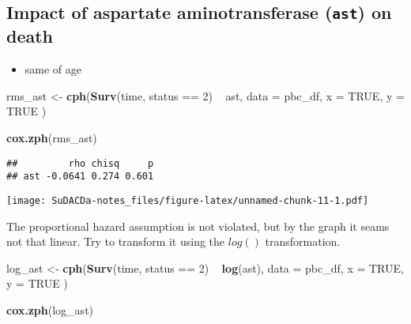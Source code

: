 \documentclass[]{book}
\newenvironment{Shaded}{\begin{snugshade}}{\end{snugshade}}
\newcommand{\KeywordTok}[1]{\textcolor[rgb]{0.13,0.29,0.53}{\textbf{{#1}}}}
\newcommand{\DataTypeTok}[1]{\textcolor[rgb]{0.13,0.29,0.53}{{#1}}}
\newcommand{\DecValTok}[1]{\textcolor[rgb]{0.00,0.00,0.81}{{#1}}}
\newcommand{\StringTok}[1]{\textcolor[rgb]{0.31,0.60,0.02}{{#1}}}
\newcommand{\OtherTok}[1]{\textcolor[rgb]{0.56,0.35,0.01}{{#1}}}
\newcommand{\NormalTok}[1]{{#1}}
\providecommand{\tightlist}{%
  \setlength{\itemsep}{0pt}\setlength{\parskip}{0pt}}
\theoremstyle{definition}
\theoremstyle{definition}
\theoremstyle{definition}
\theoremstyle{remark}
\begin{document}
\subsection{\texorpdfstring{Impact of aspartate aminotransferase
(\texttt{ast}) on
death}{Impact of aspartate aminotransferase (ast) on death}}\label{ast2}

\begin{itemize}
\tightlist
\item
  same of age
\end{itemize}

\begin{Shaded}
\begin{Highlighting}[]
\NormalTok{rms_ast <-}\StringTok{ }\KeywordTok{cph}\NormalTok{(}\KeywordTok{Surv}\NormalTok{(time, status ==}\StringTok{ }\DecValTok{2}\NormalTok{) ~}\StringTok{ }\NormalTok{ast,}
  \DataTypeTok{data =} \NormalTok{pbc_df,}
  \DataTypeTok{x    =} \OtherTok{TRUE}\NormalTok{,}
  \DataTypeTok{y    =} \OtherTok{TRUE}
\NormalTok{)}

\KeywordTok{cox.zph}\NormalTok{(rms_ast)}
\end{Highlighting}
\end{Shaded}

\begin{verbatim}
##         rho chisq     p
## ast -0.0641 0.274 0.601
\end{verbatim}

\begin{Shaded}
\end{Shaded}

\texttt{[image: SuDACDa-notes\_files/figure-latex/unnamed-chunk-11-1.pdf]}

The proportional hazard assumption is not violated, but by the graph it
seams not that linear. Try to transform it using the \(log()\)
transformation.

\begin{Shaded}
\begin{Highlighting}[]
\NormalTok{log_ast <-}\StringTok{ }\KeywordTok{cph}\NormalTok{(}\KeywordTok{Surv}\NormalTok{(time, status ==}\StringTok{ }\DecValTok{2}\NormalTok{) ~}\StringTok{ }\KeywordTok{log}\NormalTok{(ast),}
  \DataTypeTok{data =} \NormalTok{pbc_df,}
  \DataTypeTok{x    =} \OtherTok{TRUE}\NormalTok{,}
  \DataTypeTok{y    =} \OtherTok{TRUE}
\NormalTok{)}

\KeywordTok{cox.zph}\NormalTok{(log_ast)}
\end{Highlighting}
\end{Shaded}
\end{document}
